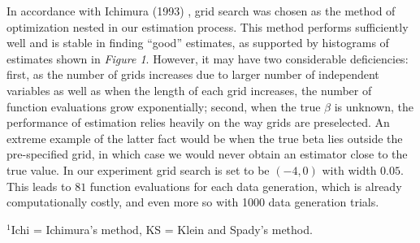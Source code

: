 \documentclass[a4paper]{article}
\begin{document}
In accordance with Ichimura (1993) \cite{[6]}, grid search was chosen as the method of optimization nested in our estimation process. This method performs sufficiently well and is stable in finding ``good'' estimates, as supported by histograms of estimates shown in \textit{Figure 1}. However, it may have two considerable deficiencies: first, as the number of grids increases due to larger number of independent variables as well as when the length of each grid increases, the number of function evaluations grow exponentially; second, when the true $\beta$ is unknown, the performance of estimation relies heavily on the way grids are preselected. An extreme example of the latter fact would be when the true beta lies outside the pre-specified grid, in which case we would never obtain an estimator close to the true value. In our experiment grid search is set to be $(-4,0)$ with width $0.05$. This leads to $81$ function evaluations for each data generation, which is already computationally costly, and even more so with 1000 data generation trials. 

\begin{table}[H]

\centering
{}
\caption {Bias and Root Mean Squared Error Comparison} \label{tab:bias and mean squared error}

$^1$Ichi = Ichimura's method, KS = Klein and Spady's method.

\end{table}
\end{document}
